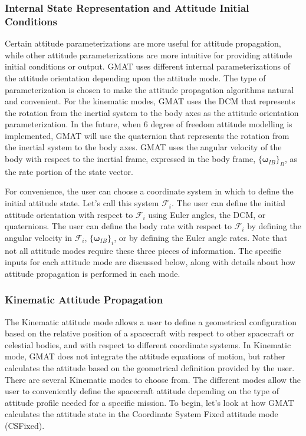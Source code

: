 \vspace{- .1 in} \subsubsection{Internal State Representation and
Attitude Initial Conditions}

Certain attitude parameterizations are more useful for attitude
propagation, while other attitude parameterizations are more
intuitive for providing attitude initial conditions or output. GMAT
uses different internal parameterizations of the attitude
orientation depending upon the attitude mode.  The type of
parameterization is chosen to make the attitude propagation
algorithms natural and convenient.  For the kinematic modes, GMAT
uses the DCM that represents the rotation from the inertial system
to the body axes as the attitude orientation parameterization. In
the future, when 6 degree of freedom attitude modelling is
implemented, GMAT will use the quaternion that represents the
rotation from the inertial system to the body axes. GMAT uses the
angular velocity of the body with respect to the inertial frame,
expressed in the body frame, $\{\boldsymbol\omega_{IB}\}_B$, as the
rate portion of the state vector.

For convenience, the user can choose a coordinate system in which to
define the initial attitude state.  Let's call this system
$\mathcal{F}_i$.  The user can define the initial attitude
orientation with respect to $\mathcal{F}_i$ using Euler angles, the
DCM, or quaternions.  The user can define the body rate with respect
to $\mathcal{F}_i$ by defining the angular velocity in
$\mathcal{F}_i$, $\{\boldsymbol\omega_{IB}\}_i$, or by defining the
Euler angle rates.  Note that not all attitude modes require these
three pieces of information.  The specific inputs for each attitude
mode are discussed below, along with details about how attitude
propagation is performed in each mode.

\subsubsection{Kinematic Attitude Propagation}

The Kinematic attitude mode allows a user to define a geometrical
configuration based on the relative position of a spacecraft with
respect to other spacecraft or celestial bodies, and with respect to
different coordinate systems.  In Kinematic mode, GMAT does not
integrate the attitude equations of motion, but rather calculates
the attitude based on the geometrical definition provided by the
user.  There are several Kinematic modes to choose from.  The
different modes allow the user to conveniently define the spacecraft
attitude depending on the type of attitude profile needed for a
specific mission.  To begin, let's look at how GMAT calculates the
attitude state in the Coordinate System Fixed attitude mode
(CSFixed).

